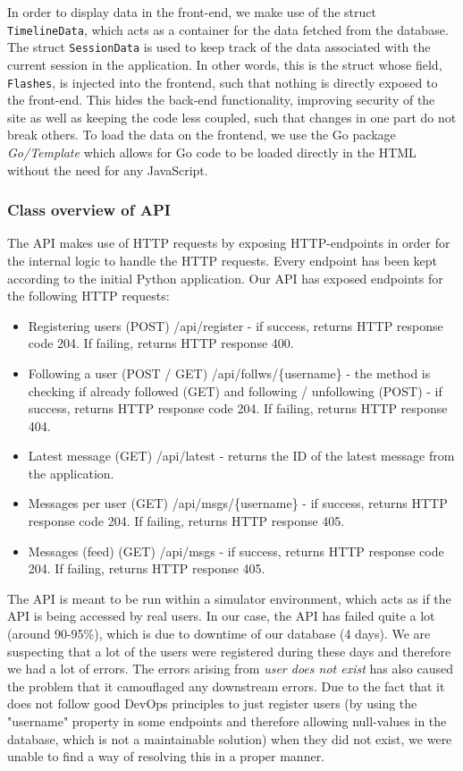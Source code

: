 In order to display data in the front-end, we make use of the struct \texttt{TimelineData}, which acts as a container for the data fetched from the database. The struct \texttt{SessionData} is used to keep track of the data associated with the current session in the application. In other words, this is the struct whose field, \texttt{Flashes}, is injected into the frontend, such that nothing is directly exposed to the front-end. This hides the back-end functionality, improving security of the site as well as keeping the code less coupled, such that changes in one part do not break others. To load the data on the frontend, we use the Go package \textit{Go/Template} which allows for Go code to be loaded directly in the HTML without the need for any JavaScript.

\newpage

\subsubsection*{Class overview of API}
The API makes use of HTTP requests by exposing HTTP-endpoints in order for the internal logic to handle the HTTP requests. Every endpoint has been kept according to the initial Python application.  
Our API has exposed endpoints for the following HTTP requests:
\begin{itemize}
    \item Registering users (POST) /api/register - if success, returns HTTP response code 204. If failing, returns HTTP response 400.
    \item Following a user (POST / GET) /api/follws/\{username\} - the method is checking if already followed (GET) and following / unfollowing (POST)  - if success, returns HTTP response code 204. If failing, returns HTTP response 404.
    \item Latest message (GET) /api/latest  - returns the ID of the latest message from the application.
    \item Messages per user (GET) /api/msgs/\{username\} - if success, returns HTTP response code 204. If failing, returns HTTP response 405.
    \item Messages (feed) (GET) /api/msgs - if success, returns HTTP response code 204. If failing, returns HTTP response 405.
\end{itemize}

The API is meant to be run within a simulator environment, which acts as if the API is being accessed by real users. In our case, the API has failed quite a lot (around 90-95\%), which is due to downtime of our database (4 days). We are suspecting that a lot of the users were registered during these days and therefore we had a lot of errors. The errors arising from \textit{user does not exist} has also caused the problem that it camouflaged any downstream errors. Due to the fact that it does not follow good DevOps principles to just register users (by using the "username" property in some endpoints and therefore allowing null-values in the database, which is not a maintainable solution) when they did not exist, we were unable to find a way of resolving this in a proper manner.

